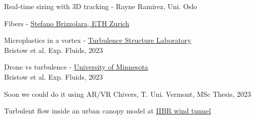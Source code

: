 \begin{frame}[label=app-6]{Real-time sizing with 3D tracking - Rayne Ramirez, Uni. Oslo}
    \begin{multicols*}{2}
    \end{multicols*}
\end{frame}
    
\begin{frame}[label=app-7]{Fibers - \href{https://www.dropbox.com/s/y5gf55qqeyq5ljr/fibers.mp4?raw=1}{Stefano Brizzolara, ETH Zurich}}
\end{frame}

\begin{frame}[label=app-8a]{Microplastics in a vortex - \href{https://www.dropbox.com/s/in5ewv968dy9j3q/microplastics.mp4?raw=1}{Turbulence Structure Laboratory}}
    \\
    Bristow et al. Exp. Fluids, 2023
\end{frame}
    
\begin{frame}[label=app-8]{Drone vs turbulence - \href{https://www.dropbox.com/s/3lav5rf6s8su6f5/drone.mp4?raw=1}{University of Minnesota}}
    \\
    Bristow et al. Exp. Fluids, 2023
\end{frame}
    
\begin{frame}[label=app-9]{Soon we could do it using AR/VR}
    Chivers, T. Uni. Vermont, MSc Thesis, 2023
\end{frame}
    
    
\begin{frame}[label=app-811]{Turbulent flow inside an urban canopy model at \href{https://www.dropbox.com/s/9x43i2uk9q38fho/flow_inside_laser.mp4?raw=1}{IIBR wind tunnel}}
\end{frame}
%    

%